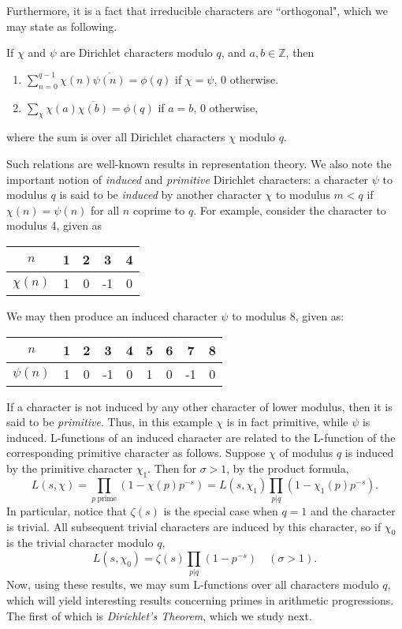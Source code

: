 Furthermore, it is a fact that irreducible characters are ``orthogonal", which we may state as following.
\begin{proposition}
\label{OrthogonalityRelations}
If $\chi$ and $\psi$ are Dirichlet characters modulo $q$, and $a, b \in \mathbb{Z}$, then
\begin{enumerate}
    \item $\sum_{n=0}^{q-1} \chi(n)\overline{\psi(n)} = \phi(q)$ if $\chi=\psi$, $0$ otherwise.
    \item $\sum_{\chi}\chi(a)\overline{\chi(b)} = \phi(q)$ if $a=b$, $0$ otherwise,
\end{enumerate}
where the sum is over all Dirichlet characters $\chi$ modulo $q$.
\end{proposition}
Such relations are well-known results in representation theory. We also note the important notion of \textit{induced} and \textit{primitive} Dirichlet characters: a character $\psi$ to modulus $q$ is said to be \textit{induced} by another character $\chi$ to modulus $m < q$ if $\chi(n) = \psi(n)$ for all $n$ coprime to $q$. For example, consider the character to modulus 4, given as
\begin{center}
    \begin{tabular}{c|c c c c}
        $n$ &  1 & 2 & 3 & 4\\
        \hline
        $\chi(n)$ & 1 & 0 & -1 & 0
    \end{tabular}
\end{center}
We may then produce an induced character $\psi$ to modulus 8, given as:
\begin{center}
    \begin{tabular}{c|c c c c c c c c}
        $n$ & 1 & 2 & 3 & 4 & 5 & 6 & 7 & 8\\
        \hline
        $\psi(n)$ & 1 & 0 & -1 & 0 & 1 & 0 & -1 & 0
    \end{tabular}
\end{center}
If a character is not induced by any other character of lower modulus, then it is said to be \textit{primitive}. Thus, in this example $\chi$ is in fact primitive, while $\psi$ is induced. L-functions of an induced character are related to the L-function of the corresponding primitive character as follows. Suppose $\chi$ of modulus $q$ is induced by the primitive character $\chi_1$. Then for $\sigma > 1$, by the product formula,
\begin{equation}
\label{InducedCharacterRelation}
    L(s, \chi) = \prod_{p \ \textrm{prime}}(1 - \chi(p)p^{-s}) = L(s, \chi_1) \prod_{p \rvert q}(1 - \chi_{1}(p)p^{-s}).
\end{equation}
In particular, notice that $\zeta(s)$ is the special case when $q = 1$ and the character is trivial. All subsequent trivial characters are induced by this character, so if $\chi_0$ is the trivial character modulo $q$,
\begin{equation}
\label{LZetaRelation}
    L(s, \chi_{0}) = \zeta(s) \prod_{p \rvert q}(1 - p^{-s}) \quad (\sigma > 1). 
\end{equation}
Now, using these results, we may sum L-functions over all characters modulo $q$, which will yield interesting results concerning primes in arithmetic progressions. The first of which is \textit{Dirichlet's Theorem}, which we study next.